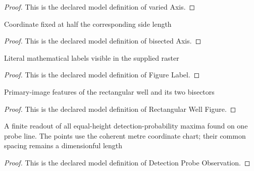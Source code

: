 \begin{proof}
  This is the declared model definition of varied Axis.
\end{proof}
\begin{definition}
  \label{def:physics:phyx-mini-0584:phyxminiproblems-problemphyxmini0584-probeline-bisectedaxis}
  Coordinate fixed at half the corresponding side length
\end{definition}
\begin{proof}
  This is the declared model definition of bisected Axis.
\end{proof}
\begin{definition}
  \label{def:physics:phyx-mini-0584:phyxminiproblems-problemphyxmini0584-figurelabel}
  Literal mathematical labels visible in the supplied raster
\end{definition}
\begin{proof}
  This is the declared model definition of Figure Label.
\end{proof}
\begin{definition}
  \label{def:physics:phyx-mini-0584:phyxminiproblems-problemphyxmini0584-rectangularwellfigure}
  Primary-image features of the rectangular well and its two bisectors
\end{definition}
\begin{proof}
  This is the declared model definition of Rectangular Well Figure.
\end{proof}
\begin{definition}
  \label{def:physics:phyx-mini-0584:phyxminiproblems-problemphyxmini0584-detectionprobeobservation}
  A finite readout of all equal-height detection-probability maxima found on one probe line. The points use the coherent metre coordinate chart; their common spacing remains a dimensionful length
\end{definition}
\begin{proof}
  This is the declared model definition of Detection Probe Observation.
\end{proof}
